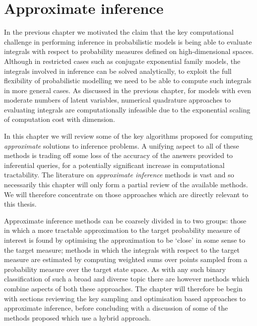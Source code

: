 \chapter{Approximate inference}\label{ch:approximate-inference}

In the previous chapter we motivated the claim that the key computational challenge in performing inference in probabilistic models is being able to evaluate integrals with respect to probability measures defined on high-dimensional spaces. Although in restricted cases such as conjugate exponential family models, the integrals involved in inference can be solved analytically, to exploit the full flexibility of probabilistic modelling we need to be able to compute such integrals in more general cases. As discussed in the previous chapter, for models with even moderate numbers of latent variables, numerical quadrature approaches to evaluating integrals are computationally infeasible due to the exponential scaling of computation cost with dimension.

In this chapter we will review some of the key algorithms proposed for computing \emph{approximate} solutions to inference problems. A unifying aspect to all of these methods is trading off some loss of the accuracy of the answers provided to inferential queries, for a potentially significant increase in computational tractability. The literature on \emph{approximate inference} methods is vast and so necessarily this chapter will only form a partial review of the available methods. We will therefore concentrate on those approaches which are directly relevant to this thesis.

Approximate inference methods can be coarsely divided in to two groups: those in which a more tractable approximation to the target probability measure of interest is found by optimising the approximation to be `close' in some sense to the target measure; methods in which the integrals with respect to the target measure are estimated by computing weighted sums over points sampled from a probability measure over the target state space. As with any such binary classification of such a broad and diverse topic there are however methods which combine aspects of both these approaches. The chapter will therefore be begin with sections reviewing the key sampling and optimisation based approaches to approximate inference, before concluding with a discussion of some of the methods proposed which use a hybrid approach.

